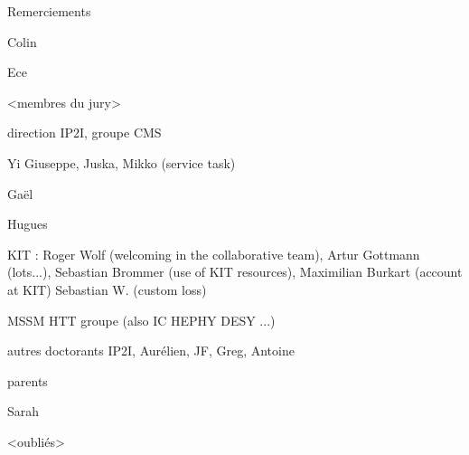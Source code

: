 Remerciements

Colin

Ece

<membres du jury>

direction IP2I, groupe CMS

Yi Giuseppe, Juska, Mikko (service task)

Gaël

Hugues

KIT : Roger Wolf (welcoming in the collaborative team), Artur Gottmann (lots...), Sebastian Brommer (use of KIT resources), Maximilian Burkart (account at KIT)
Sebastian W. (custom loss)

MSSM HTT groupe (also IC HEPHY DESY ...)

autres doctorants IP2I, Aurélien, JF, Greg, Antoine

parents

Sarah

<oubliés>

